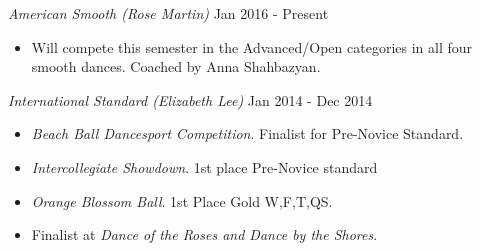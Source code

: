 {\sl American Smooth (Rose Martin)} \hfill Jan 2016 - Present \
\begin{itemize} \itemsep -2pt
  \item Will compete this semester in the Advanced/Open categories
  in all four smooth dances.  Coached by Anna Shahbazyan.
\end{itemize}

{\sl International Standard (Elizabeth Lee)} \hfill Jan 2014 - Dec 2014 \
\begin{itemize} \itemsep -2pt
  \item \textit{Beach Ball Dancesport Competition}. Finalist for Pre-Novice Standard.
  \item \textit{Intercollegiate Showdown}. 1st place Pre-Novice standard
  \item \textit{Orange Blossom Ball}. 1st Place Gold W,F,T,QS.
  \item Finalist at \textit{Dance of the Roses and Dance by the Shores}.
\end{itemize}